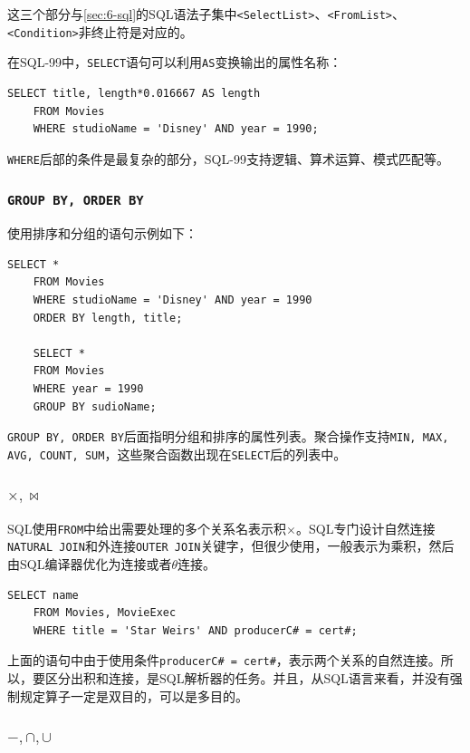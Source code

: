 这三个部分与\ref{sec:6-sql}的SQL语法子集中\texttt{<SelectList>}、\texttt{<FromList>}、\texttt{<Con\-dition>}非终止符是对应的。

在SQL-99中，\texttt{SELECT}语句可以利用\texttt{AS}变换输出的属性名称：
\begin{lstlisting}[style=verbose]
    SELECT title, length*0.016667 AS length
    FROM Movies
    WHERE studioName = 'Disney' AND year = 1990;
\end{lstlisting}

\texttt{WHERE}后部的条件是最复杂的部分，SQL-99支持逻辑、算术运算、模式匹配等。

\subsubsection*{\texttt{GROUP BY, ORDER BY}}

使用排序和分组的语句示例如下：
\begin{lstlisting}[style=verbose]
    SELECT *
    FROM Movies
    WHERE studioName = 'Disney' AND year = 1990
    ORDER BY length, title;

    SELECT *
    FROM Movies
    WHERE year = 1990
    GROUP BY sudioName;
\end{lstlisting}

\texttt{GROUP BY, ORDER BY}后面指明分组和排序的属性列表。聚合操作支持\texttt{MIN, MAX, AVG, COUNT, SUM}，这些聚合函数出现在\texttt{SELECT}后的列表中。

\subsubsection*{$\times, \bowtie$}

SQL使用\texttt{FROM}中给出需要处理的多个关系名表示积$\times$。SQL专门设计自然连接\texttt{NATURAL JOIN}和外连接\texttt{OUTER JOIN}关键字，但很少使用，一般表示为乘积，然后由SQL编译器优化为连接或者$\theta$连接。
\begin{lstlisting}[style=verbose]
    SELECT name
    FROM Movies, MovieExec
    WHERE title = 'Star Weirs' AND producerC# = cert#;
\end{lstlisting}

上面的语句中由于使用条件\texttt{producerC\# = cert\#}，表示两个关系的自然连接。所以，要区分出积和连接，是SQL解析器的任务。并且，从SQL语言来看，并没有强制规定算子一定是双目的，可以是多目的。

\subsubsection*{$-, \cap, \cup$}

